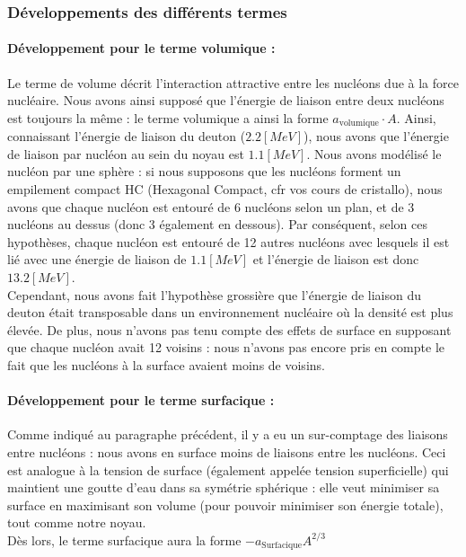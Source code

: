 \subsubsection{Développements des différents termes}
\paragraph{Développement pour le terme volumique :}


Le terme de volume décrit l'interaction attractive entre les nucléons due à la force nucléaire. Nous avons ainsi supposé que l'énergie de liaison entre deux nucléons est toujours la même : le terme volumique a ainsi la forme $a_{\text{volumique}} \cdot A$. Ainsi, connaissant l'énergie de liaison du deuton ($2.2 [MeV]$), nous avons que l'énergie de liaison par nucléon au sein du noyau est $1.1 [MeV]$. Nous avons modélisé le nucléon par une sphère : si nous supposons que les nucléons forment un empilement compact HC (Hexagonal Compact, cfr vos cours de cristallo), nous avons que chaque nucléon est entouré de 6 nucléons selon un plan, et de 3 nucléons au dessus (donc 3 également en dessous). Par conséquent, selon ces hypothèses, chaque nucléon est entouré de 12 autres nucléons avec lesquels il est lié avec une énergie de liaison de $1.1 [MeV]$ et l'énergie de liaison est donc $13.2 [MeV]$.\\

Cependant, nous avons fait l'hypothèse grossière que l'énergie de liaison du deuton était transposable dans un environnement nucléaire où la densité est plus élevée. De plus, nous n'avons pas tenu compte des effets de surface en supposant que chaque nucléon avait 12 voisins : nous n'avons pas encore pris en compte le fait que les nucléons à la surface avaient moins de voisins.


\paragraph{Développement pour le terme surfacique :}


Comme indiqué au paragraphe précédent, il y a eu un sur-comptage des liaisons entre nucléons : nous avons en surface moins de liaisons entre les nucléons. Ceci est analogue à la tension de surface (également appelée tension superficielle) qui maintient une goutte d'eau dans sa symétrie sphérique : elle veut minimiser sa surface en maximisant son volume (pour pouvoir minimiser son énergie totale), tout comme notre noyau.\\
Dès lors, le terme surfacique aura la forme $- a_{\text{Surfacique}} A^{2/3} $


